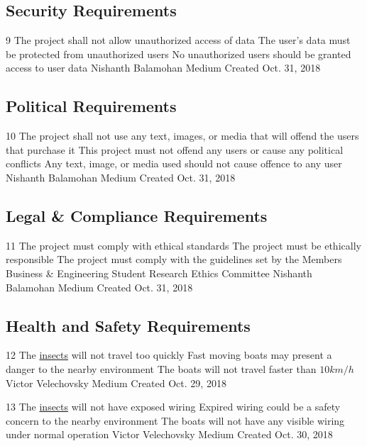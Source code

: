 \documentclass[11pt]{article}
\begin{document}
\subsection{Security Requirements}

\nonFunctionalRequirement
{9}
{The project shall not allow unauthorized access of data}
{The user's data must be protected from unauthorized users}
{No unauthorized users should be granted access to user data}
{Nishanth Balamohan}
{Medium}
{Created Oct. 31, 2018}

\subsection{Political Requirements}

\nonFunctionalRequirement
{10}
{The project shall not use any text, images, or media that will
offend the users that purchase it}
{This project must not offend any users or cause any political conflicts}
{Any text, image, or media used should not cause offence to any user}
{Nishanth Balamohan}
{Medium}
{Created Oct. 31, 2018}

\subsection{Legal \& Compliance Requirements}

\nonFunctionalRequirement
{11}
{The project must comply with ethical standards}
{The project must be ethically responsible}
{The project must comply with the guidelines set by the Members Business & Engineering Student Research Ethics Committee}
{Nishanth Balamohan}
{Medium}
{Created Oct. 31, 2018}

\subsection{Health and Safety Requirements}

\nonFunctionalRequirement
{12}
{The \hyperref[sec:definitions]{insects} will not travel too quickly}
{Fast moving boats may present a danger to the nearby environment}
{The boats will not travel faster than $10 km/h$}
{Victor Velechovsky}
{Medium}
{Created Oct. 29, 2018}

\nonFunctionalRequirement
{13}
{The \hyperref[sec:definitions]{insects} will not have exposed wiring}
{Expired wiring could be a safety concern to the nearby environment}
{The boats will not have any visible wiring under normal operation}
{Victor Velechovsky}
{Medium}
{Created Oct. 30, 2018}
\end{document}
